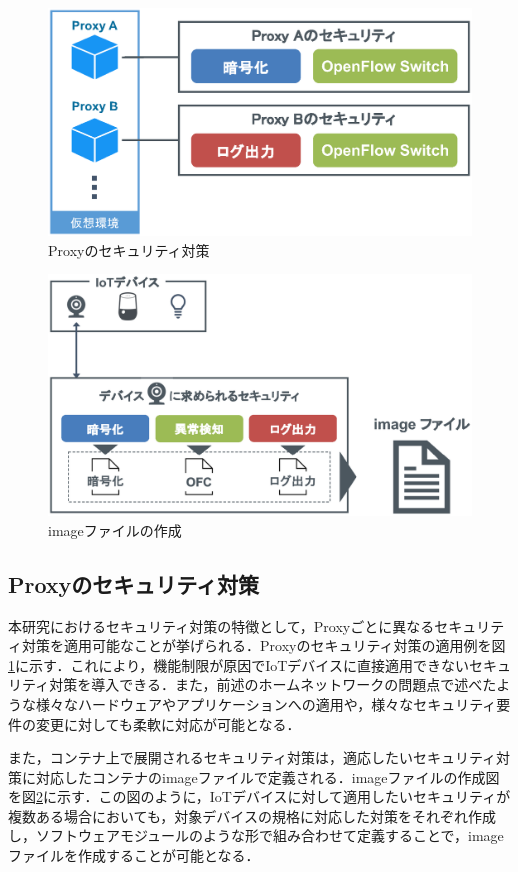 \documentclass[Japanese]{dicomopapers}
\begin{document}
\begin{figure}[!tb]
	\centering
	\includegraphics[width=\linewidth]{img/security.eps}
	\caption{Proxyのセキュリティ対策}
	\label{fig:security}
\end{figure}

\begin{figure}[!tb]
	\centering
	\includegraphics[width=\linewidth]{img/dockerimage.eps}
	\caption{imageファイルの作成}
	\label{fig:dockerimage}
\end{figure}

\subsection{Proxyのセキュリティ対策}
本研究におけるセキュリティ対策の特徴として，Proxyごとに異なるセキュリティ対策を適用可能なことが挙げられる．Proxyのセキュリティ対策の適用例を図\ref{fig:security}に示す．これにより，機能制限が原因でIoTデバイスに直接適用できないセキュリティ対策を導入できる．また，前述のホームネットワークの問題点で述べたような様々なハードウェアやアプリケーションへの適用や，様々なセキュリティ要件の変更に対しても柔軟に対応が可能となる．\par
また，コンテナ上で展開されるセキュリティ対策は，適応したいセキュリティ対策に対応したコンテナのimageファイルで定義される．imageファイルの作成図を図\ref{fig:dockerimage}に示す．この図のように，IoTデバイスに対して適用したいセキュリティが複数ある場合においても，対象デバイスの規格に対応した対策をそれぞれ作成し，ソフトウェアモジュールのような形で組み合わせて定義することで，imageファイルを作成することが可能となる．
\end{document}
